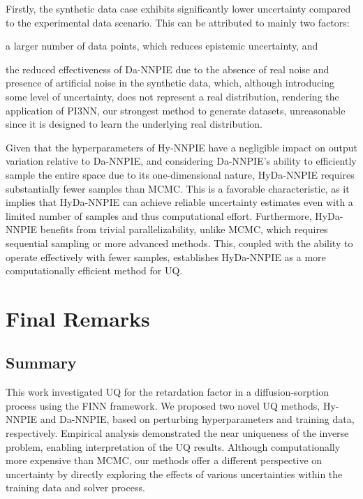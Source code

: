 Firstly, the synthetic data case exhibits significantly lower uncertainty compared to the experimental data scenario. This can be attributed to mainly two factors:
\begin{enumerate*}
    \item a larger number of data points, which reduces epistemic uncertainty, and
    \item the reduced effectiveness of Da-NNPIE due to the absence of real noise and presence of artificial noise in the synthetic data, which, although introducing some level of uncertainty, does not represent a real distribution, rendering the application of PI3NN, our strongest method to generate datasets, unreasonable since it is designed to learn the underlying real distribution.
\end{enumerate*}

Given that the hyperparameters of Hy-NNPIE have a negligible impact on output variation relative to Da-NNPIE, and considering Da-NNPIE's ability to efficiently sample the entire space due to its one-dimensional nature, HyDa-NNPIE requires substantially fewer samples than MCMC. This is a favorable characteristic, as it implies that HyDa-NNPIE can achieve reliable uncertainty estimates even with a limited number of samples and thus computational effort. Furthermore, HyDa-NNPIE benefits from trivial parallelizability, unlike MCMC, which requires sequential sampling or more advanced methods. This, coupled with the ability to operate effectively with fewer samples, establishes HyDa-NNPIE as a more computationally efficient method for UQ.




\chapter{Final Remarks}

\section{Summary}
This work investigated UQ for the retardation factor in a diffusion-sorption process using the FINN framework. We proposed two novel UQ methods, Hy-NNPIE and Da-NNPIE, based on perturbing hyperparameters and training data, respectively. Empirical analysis demonstrated the near uniqueness of the inverse problem, enabling interpretation of the UQ results. Although computationally more expensive than MCMC, our methods offer a different perspective on uncertainty by directly exploring the effects of various uncertainties within the training data and solver process.



